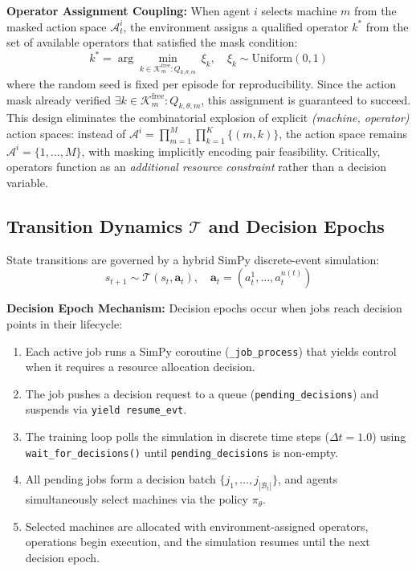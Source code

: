 \textbf{Operator Assignment Coupling:} When agent \( i \) selects machine \( m \) from the masked action space \( \mathcal{A}_t^i \), the environment assigns a qualified operator \( k^* \) from the set of available operators that satisfied the mask condition:
\[
k^* = \arg\min_{k \in \mathcal{K}_m^{\text{free}} : Q_{k,\theta,m}} \, \xi_k, \quad \xi_k \sim \text{Uniform}(0,1)
\]
where the random seed is fixed per episode for reproducibility. Since the action mask already verified \( \exists k \in \mathcal{K}_m^{\text{free}} : Q_{k,\theta,m} \), this assignment is guaranteed to succeed. This design eliminates the combinatorial explosion of explicit \textit{(machine, operator)} action spaces: instead of \( \mathcal{A}^i = \prod_{m=1}^M \prod_{k=1}^K \{(m,k)\} \), the action space remains \( \mathcal{A}^i = \{1,\ldots,M\} \), with masking implicitly encoding pair feasibility. Critically, operators function as an \textit{additional resource constraint} rather than a decision variable.

\subsection{Transition Dynamics $\mathcal{T}$ and Decision Epochs}
State transitions are governed by a hybrid SimPy discrete-event simulation:
\begin{equation}
s_{t+1} \sim \mathcal{T}(s_t, \mathbf{a}_t), \quad \mathbf{a}_t = (a_t^1, \ldots, a_t^{n(t)})
\end{equation}

\textbf{Decision Epoch Mechanism:} Decision epochs occur when jobs reach decision points in their lifecycle:
\begin{enumerate}
    \item Each active job runs a SimPy coroutine (\texttt{\_job\_process}) that yields control when it requires a resource allocation decision.
    \item The job pushes a decision request to a queue (\texttt{pending\_decisions}) and suspends via \texttt{yield resume\_evt}.
    \item The training loop polls the simulation in discrete time steps (\( \Delta t = 1.0 \)) using \texttt{wait\_for\_decisions()} until \texttt{pending\_decisions} is non-empty.
    \item All pending jobs form a decision batch \( \{j_1, \ldots, j_{|\mathcal{B}_t|}\} \), and agents simultaneously select machines via the policy \( \pi_\theta \).
    \item Selected machines are allocated with environment-assigned operators, operations begin execution, and the simulation resumes until the next decision epoch.
\end{enumerate}

